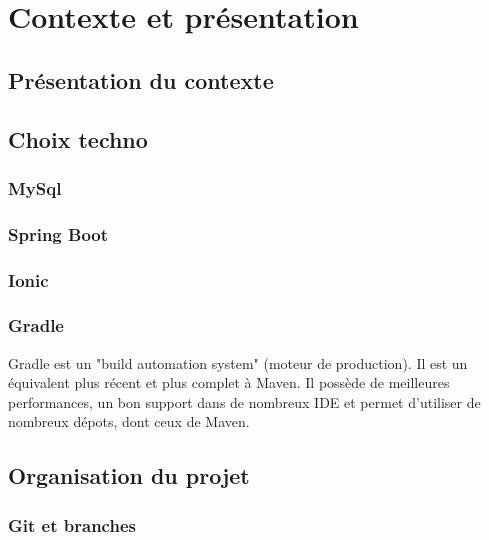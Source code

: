 \chapter{Contexte et présentation}
	\section{Présentation du contexte}

	\section{Choix techno}


		\subsection{MySql}

		\subsection{Spring Boot}

		\subsection{Ionic}

		\subsection{Gradle}
			Gradle est un "build automation system" (moteur de production). Il est un équivalent plus récent et plus complet à Maven. Il possède de meilleures performances, un bon support dans de nombreux IDE et permet d'utiliser de nombreux dépots, dont ceux de Maven.

	\section{Organisation du projet}
		\subsection{Git et branches}
